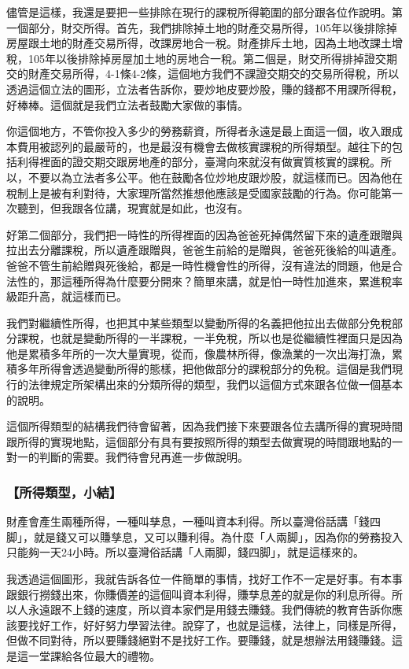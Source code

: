 \documentclass[oneside,sub3section]{ctexbook}
\begin{document}
儘管是這樣，我還是要把一些排除在現行的課稅所得範圍的部分跟各位作說明。第一個部分，財交所得。首先，我們排除掉土地的財產交易所得，105年以後排除掉房屋跟土地的財產交易所得，改課房地合一稅。財產排斥土地，因為土地改課土增稅，105年以後排除掉房屋加土地的房地合一稅。第二個是，財交所得排掉證交期交的財產交易所得，4-1條4-2條，這個地方我們不課證交期交的交易所得稅，所以透過這個立法的圖形，立法者告訴你，要炒地皮要炒股，賺的錢都不用課所得稅，好棒棒。這個就是我們立法者鼓勵大家做的事情。

你這個地方，不管你投入多少的勞務薪資，所得者永遠是最上面這一個，收入跟成本費用被認列的最嚴苛的，也是最沒有機會去做核實課稅的所得類型。越往下的包括利得裡面的證交期交跟房地產的部分，臺灣向來就沒有做實質核實的課稅。所以，不要以為立法者多公平。他在鼓勵各位炒地皮跟炒股，就這樣而已。因為他在稅制上是被有利對待，大家理所當然推想他應該是受國家鼓勵的行為。你可能第一次聽到，但我跟各位講，現實就是如此，也沒有。

好第二個部分，我們把一時性的所得裡面的因為爸爸死掉偶然留下來的遺產跟贈與拉出去分離課稅，所以遺產跟贈與，爸爸生前給的是贈與，爸爸死後給的叫遺產。爸爸不管生前給贈與死後給，都是一時性機會性的所得，沒有違法的問題，他是合法性的，那這種所得為什麼要分開來？簡單來講，就是怕一時性加進來，累進稅率級距升高，就這樣而已。

我們對繼續性所得，也把其中某些類型以變動所得的名義把他拉出去做部分免稅部分課稅，也就是變動所得的一半課稅，一半免稅，所以也是從繼續性裡面只是因為他是累積多年所的一次大量實現，從而，像農林所得，像漁業的一次出海打漁，累積多年所得會透過變動所得的態樣，把他做部分的課稅部分的免稅。這個是我們現行的法律規定所架構出來的分類所得的類型，我們以這個方式來跟各位做一個基本的說明。

這個所得類型的結構我們待會留著，因為我們接下來要跟各位去講所得的實現時間跟所得的實現地點，這個部分有具有要按照所得的類型去做實現的時間跟地點的一對一的判斷的需要。我們待會兒再進一步做說明。

\hypertarget{ux6240ux5f97ux985eux578bux5c0fux7d50}{%
\subsubsection{【所得類型，小結】}\label{ux6240ux5f97ux985eux578bux5c0fux7d50}}

財產會產生兩種所得，一種叫孳息，一種叫資本利得。所以臺灣俗話講「錢四脚」，就是錢又可以賺孳息，又可以賺利得。為什麼「人兩脚」，因為你的勞務投入只能夠一天24小時。所以臺灣俗話講「人兩脚，錢四脚」，就是這樣來的。

我透過這個圖形，我就告訴各位一件簡單的事情，找好工作不一定是好事。有本事跟銀行撈錢出來，你賺價差的這個叫資本利得，賺孳息差的就是你的利息所得。所以人永遠跟不上錢的速度，所以資本家們是用錢去賺錢。我們傳統的教育告訴你應該要找好工作，好好努力學習法律。說穿了，也就是這樣，法律上，同樣是所得，但做不同對待，所以要賺錢絕對不是找好工作。要賺錢，就是想辦法用錢賺錢。這是這一堂課給各位最大的禮物。
\end{document}
